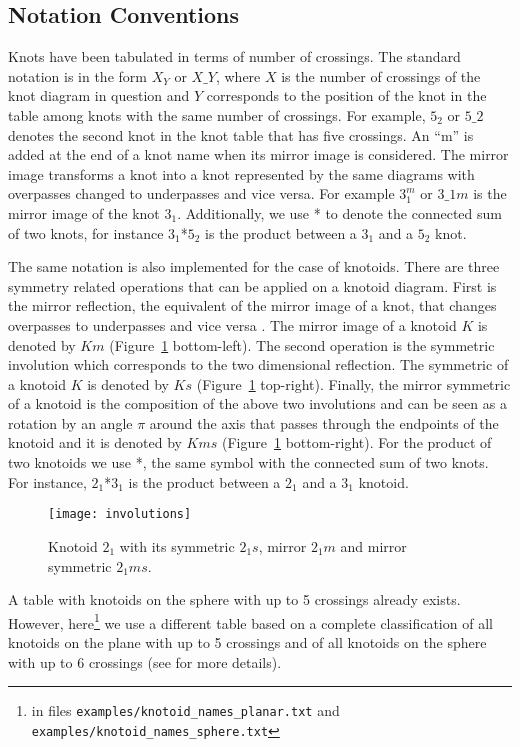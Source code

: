 \subsection{\label{sec:theory:notations}Notation Conventions}
Knots have been tabulated in terms of number of crossings\cite{Rolfsen1976, Adams}. The standard notation is in the form $X_Y$ or $X\_ Y$, where $X$ is the number of crossings of the knot diagram in question and $Y$ corresponds to the position of the knot in the table among knots with the same number of crossings. For example, $5_2$ or $5\_2$ denotes the second knot in the knot table that has five crossings. An ``m'' is added at the end of a knot name when its mirror image is considered. The mirror image transforms a knot into a knot represented by the same diagrams with overpasses changed to underpasses and vice versa\cite{Adams}. For example $3_1^m$ or $3\_1m$ is the mirror image of the knot $3_1$. Additionally, we use * to denote the connected sum of two knots, for instance $3_1$*$5_2$ is the product between a $3_1$ and a $5_2$ knot.

The same notation is also implemented for the case of knotoids. There are three symmetry related operations that can be applied on a knotoid diagram. First is the mirror reflection, the equivalent of the mirror image of a knot, that changes overpasses to underpasses and vice versa \cite{turaev}. The mirror image of a knotoid $K$ is denoted by $Km$ (Figure~\ref{fig:involutions} bottom-left). The second operation is the symmetric involution which corresponds to the two dimensional reflection. The symmetric of a knotoid $K$ is denoted by $Ks$ (Figure~\ref{fig:involutions} top-right). Finally, the mirror symmetric of a knotoid is the composition of the above two involutions and can be seen as a rotation by an angle $\pi$ around the axis that passes through the endpoints of the knotoid and it is denoted by $Kms$ (Figure~\ref{fig:involutions} bottom-right). For the product of two knotoids we use *, the same symbol with the connected sum of two knots. For instance, $2_1$*$3_1$ is the product between a $2_1$ and a $3_1$ knotoid.
\begin{figure}[h]
\centering
\texttt{[image: involutions]}
\caption{Knotoid $2_1$ with its symmetric $2_1s$, mirror $2_1m$ and mirror symmetric $2_1ms$.}\label{fig:involutions}
\end{figure}


A table with knotoids on the sphere with up to 5 crossings already exists\cite{bartholomew}. However, here\footnote{in files \lstinline{examples/knotoid_names_planar.txt} and \lstinline{examples/knotoid_names_sphere.txt}} we use a different table based on a complete classification of all knotoids on the plane with up to 5 crossings and of all knotoids on the sphere with up to 6 crossings (see \cite{goundaroulis2019} for more details).

